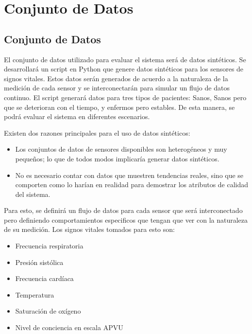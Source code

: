 \section{Conjunto de Datos}

\subsection{Conjunto de Datos}

El conjunto de datos utilizado para evaluar el sistema será de datos sintéticos. 
Se desarrollará un script en Python que genere datos sintéticos para los sensores de signos vitales.
Estos datos serán generados de acuerdo a la naturaleza de la medición de cada sensor y se interconectarán para simular un flujo de datos continuo.
El script generará datos para tres tipos de pacientes: Sanos, Sanos pero que se deterioran con el tiempo, y enfermos pero estables. 
De esta manera, se podrá evaluar el sistema en diferentes escenarios.

Existen dos razones principales para el uso de datos sintéticos: 

\begin{itemize}
    \item Los conjuntos de datos de sensores disponibles son heterogéneos y muy pequeños; lo que de todos modos implicaría generar datos sintéticos.
    \item No es necesario contar con datos que muestren tendencias reales, sino que se comporten como lo harían en realidad para demostrar los atributos de calidad del sistema.
\end{itemize}

Para esto, se definirá un flujo de datos para cada sensor que será interconectado pero definiendo comportamientos especificos que tengan que ver con la naturaleza de su medición.
Los signos vitales tomados para esto son: 

\begin{itemize}
    \item Frecuencia respiratoria
    \item Presión sistólica
    \item Frecuencia cardíaca
    \item Temperatura
    \item Saturación de oxígeno
    \item Nivel de conciencia en escala APVU
\end{itemize}